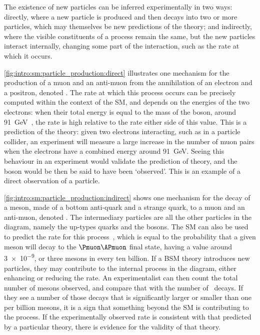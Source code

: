 The existence of new particles can be inferred experimentally in two ways: 
directly, where a new particle is produced and then decays into two or more 
particles, which may themselves be new predictions of the theory; and 
indirectly, where the visible constituents of a process remain the same, but 
the new particles interact internally, changing some part of the interaction, 
such as the rate at which it occurs.

\cref{fig:intro:sm:particle_production:direct} illustrates one mechanism for 
the production of a muon and an anti-muon from the annihilation of an electron 
and a positron, denoted \decay{\Pelectron\APelectron}{\Pmuon\APmuon}.
The rate at which this process occurs can be precisely computed within the 
context of the \ac{SM}, and depends on the energies of the two electrons: when 
their total energy is equal to the mass of the \PZ boson, around 
\SI{91}{\GeV}~\cite{PDG2014}, the rate is high relative to the rate either side 
of this value.
This is a prediction of the theory: given two electrons interacting, such as in 
a particle collider, an experiment will measure a large increase in the number 
of muon pairs when the electrons have a combined energy around \SI{91}{\GeV}.
Seeing this behaviour in an experiment would validate the prediction of theory, 
and the \PZ boson would be then be said to have been `observed'.
This is an example of a direct observation of a particle.

\cref{fig:intro:sm:particle_production:indirect} shows one mechanism for the 
decay of a \PBs meson, made of a bottom anti-quark and a strange quark, to a 
muon and an anti-muon, denoted \BsTomumu.
The intermediary particles are all the other particles in the diagram, namely 
the up-types quarks and the \PW bosons.
The \ac{SM} can also be used to predict the rate for this 
process~\cite{Bobeth:2013uxa}, which is equal to the probability that a given 
\PBs meson will decay to the $\Pmuon\APmuon$ final state, having a value around 
\num{3e-9}, or three \PBs mesons in every ten billion.
If a \ac{BSM} theory introduces new particles, they may contribute to the 
internal process in the diagram, either enhancing or reducing the rate.
An experimentalist can then count the total number of \PBs mesons observed, and 
compare that with the number of \BsTomumu\ decays.
If they see a number of those decays that is significantly larger or smaller 
than one per billion \PBs mesons, it is a sign that something beyond the 
\ac{SM} is contributing to the process.
If the experimentally observed rate is consistent with that predicted by a 
particular theory, there is evidence for the validity of that theory.

